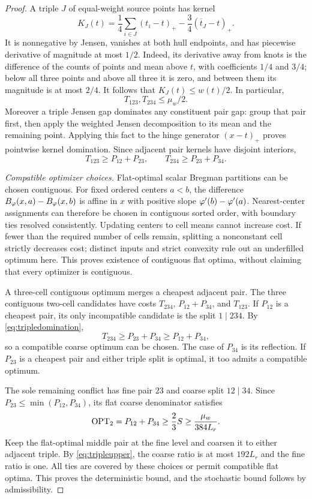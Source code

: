 \begin{proof}
A triple $J$ of equal-weight source points has kernel
\[
K_J(t)=\frac14\sum_{i\in J}(t_i-t)_+-\frac34(\overline t_J-t)_+.
\]
It is nonnegative by Jensen, vanishes at both hull endpoints, and has piecewise derivative of magnitude at most $1/2$. Indeed, its derivative away from knots is the difference of the counts of points and mean above $t$, with coefficients $1/4$ and $3/4$; below all three points and above all three it is zero, and between them its magnitude is at most $2/4$. It follows that $K_J(t)\le w(t)/2$. In particular,
\begin{equation}
T_{123},T_{234}\le\mu_w/2.
\label{eq:tripleupper}
\end{equation}
Moreover a triple Jensen gap dominates any constituent pair gap: group that pair first, then apply the weighted Jensen decomposition to its mean and the remaining point. Applying this fact to the hinge generator $(x-t)_+$ proves pointwise kernel domination. Since adjacent pair kernels have disjoint interiors,
\begin{equation}
T_{123}\ge P_{12}+P_{23},\qquad T_{234}\ge P_{23}+P_{34}.
\label{eq:tripledomination}
\end{equation}

\emph{Compatible optimizer choices.}
Flat-optimal scalar Bregman partitions can be chosen contiguous. For fixed ordered centers $a<b$, the difference $B_{\varphi}(x,a)-B_{\varphi}(x,b)$ is affine in $x$ with positive slope $\varphi'(b)-\varphi'(a)$. Nearest-center assignments can therefore be chosen in contiguous sorted order, with boundary ties resolved consistently. Updating centers to cell means cannot increase cost. If fewer than the required number of cells remain, splitting a nonconstant cell strictly decreases cost; distinct inputs and strict convexity rule out an underfilled optimum here. This proves existence of contiguous flat optima, without claiming that every optimizer is contiguous.

A three-cell contiguous optimum merges a cheapest adjacent pair. The three contiguous two-cell candidates have costs $T_{234}$, $P_{12}+P_{34}$, and $T_{123}$. If $P_{12}$ is a cheapest pair, its only incompatible candidate is the split $1\mid234$. By \eqref{eq:tripledomination},
\[
T_{234}\ge P_{23}+P_{34}\ge P_{12}+P_{34},
\]
so a compatible coarse optimum can be chosen. The case of $P_{34}$ is its reflection. If $P_{23}$ is a cheapest pair and either triple split is optimal, it too admits a compatible optimum.

The sole remaining conflict has fine pair $23$ and coarse split $12\mid34$. Since $P_{23}\le\min(P_{12},P_{34})$, its flat coarse denominator satisfies
\[
\operatorname{OPT}_2=P_{12}+P_{34}\ge\frac23S\ge\frac{\mu_w}{384L_r}.
\]
Keep the flat-optimal middle pair at the fine level and coarsen it to either adjacent triple. By \eqref{eq:tripleupper}, the coarse ratio is at most $192L_r$ and the fine ratio is one. All ties are covered by these choices or permit compatible flat optima. This proves the deterministic bound, and the stochastic bound follows by admissibility.
\end{proof}

